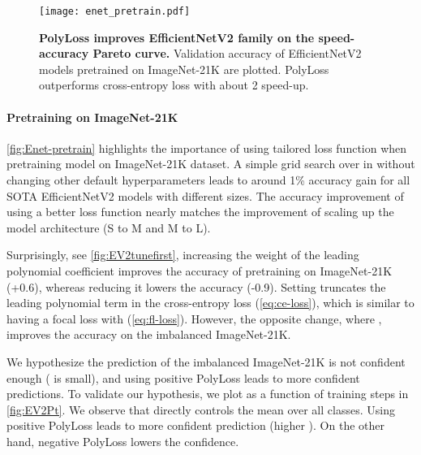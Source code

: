 \begin{wrapfigure}{r}{0.5\textwidth}
  \vspace{-20pt}
  \centering
  \texttt{[image: enet\_pretrain.pdf]}
    \vspace{-10pt}
  \caption{\textbf{PolyLoss improves EfficientNetV2 family on the speed-accuracy Pareto curve.} Validation accuracy of EfficientNetV2 models pretrained on ImageNet-21K are plotted. PolyLoss outperforms cross-entropy loss with about 2 speed-up.}
  \label{fig:Enet-pretrain}
    \vspace{-15pt}
\end{wrapfigure}
\vspace{-10pt}
\paragraph{Pretraining on ImageNet-21K}\autoref{fig:Enet-pretrain} highlights the importance of using tailored loss function when pretraining model on ImageNet-21K dataset. A simple grid search over  in  without changing other default hyperparameters leads to around 1\% accuracy gain for all SOTA EfficientNetV2 models with different sizes.  The accuracy improvement of using a better loss function nearly matches the improvement of scaling up the model architecture (S to M and M to L). 

Surprisingly, see \autoref{fig:EV2tunefirst}, increasing the weight of the leading polynomial coefficient improves the accuracy of pretraining on ImageNet-21K (+0.6), whereas reducing it lowers the accuracy (-0.9). Setting  truncates the leading polynomial term in the cross-entropy loss (\autoref{eq:ce-loss}), which is similar to having a focal loss with  (\autoref{eq:fl-loss}).
However, the opposite change, where , improves the accuracy on the imbalanced ImageNet-21K. 

We hypothesize the prediction of the imbalanced ImageNet-21K is not confident enough ( is small), and using positive  PolyLoss leads to more confident predictions. To validate our hypothesis, we plot  as a function of training steps in \autoref{fig:EV2Pt}. We observe that  directly controls the mean  over all classes. Using positive  PolyLoss leads to more confident prediction (higher ). On the other hand, negative  PolyLoss lowers the confidence. 

